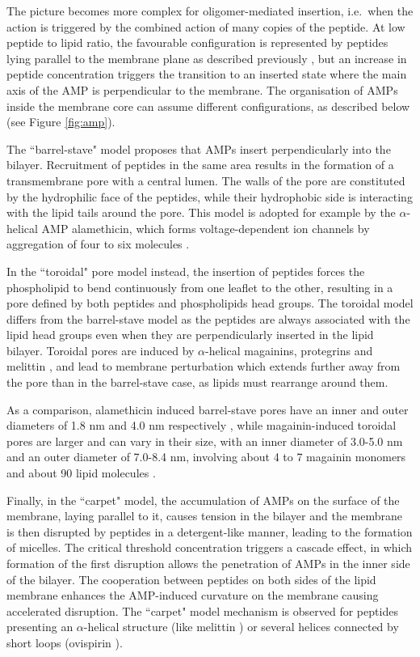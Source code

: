 The picture becomes more complex for oligomer-mediated insertion, i.e.\ when the action is triggered by the combined action of many copies of the peptide.
%
At low peptide to lipid ratio, the favourable configuration is represented by peptides lying parallel to the membrane plane as described previously \cite{Yang2001}, but an increase in peptide concentration triggers the transition to an inserted state where the main axis of the AMP is perpendicular to the membrane. The organisation of AMPs inside the membrane core can assume different configurations, as described below \cite{Brogden2005,Nguyen2011,Ebenhan2014,Mahlapuu2016} (see Figure \ref{fig:amp}).

The ``barrel-stave" model proposes that AMPs insert perpendicularly into the bilayer.
Recruitment of peptides in the same area results in the formation of a transmembrane pore with a central lumen. The walls of the pore are constituted by the hydrophilic face of the peptides, while their hydrophobic side is interacting with the lipid tails around the pore. This model is adopted for example by the $\alpha$-helical AMP alamethicin, which forms voltage-dependent ion channels by aggregation of four to six molecules \cite{Spaar2004}.

In the ``toroidal" pore model instead, the insertion of peptides forces the phospholipid to bend continuously from one leaflet to the other, resulting in a pore defined by both peptides and phospholipids head groups.
%
The toroidal model differs from the barrel-stave model as the peptides are always associated with the lipid head groups even when they are perpendicularly inserted in the lipid  bilayer. Toroidal pores are induced by $\alpha$-helical magainins, protegrins and melittin \cite{Yang2001,Matsuzaki1996,Hallock2003}, and lead to membrane perturbation which extends further away from the pore than in the barrel-stave case, as lipids must rearrange around them.

As a comparison, alamethicin induced barrel-stave pores have an inner and outer diameters of 1.8 nm and 4.0 nm respectively \cite{Spaar2004}, while magainin-induced toroidal pores are larger and can vary in their size, with an inner diameter of 3.0-5.0 nm and an outer diameter of 7.0-8.4 nm, involving about 4 to 7 magainin monomers and about 90 lipid molecules \cite{Matsuzaki1997}.

Finally, in the ``carpet" model, the accumulation of AMPs on the surface of the membrane, laying parallel to it, causes tension in the bilayer and the membrane is then disrupted by peptides in a detergent-like manner, leading to the formation of micelles.
%
The critical threshold concentration triggers a cascade effect, in which formation of the first disruption allows the penetration of AMPs in the inner side of the bilayer. The cooperation between peptides on both sides of the lipid membrane enhances the AMP-induced curvature on the membrane causing accelerated disruption.
%
The ``carpet" model mechanism is observed for peptides presenting an $\alpha$-helical structure (like melittin \cite{Ladokhin2001}) or several helices connected by short loops (ovispirin \cite{Yamaguchi2001}).

